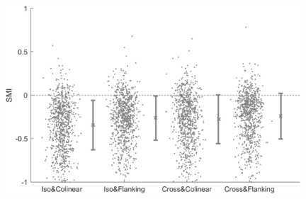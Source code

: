 \begin{figure}[H] \centering \includegraphics[width=11cm,height=11cm,keepaspectratio]{Figures/7.Results/finalPopulation/sel/popPlots_VisROIs_Cor_2SalignmentAngle.png} 
\end{figure}

% 
%    
%           
%
%        

